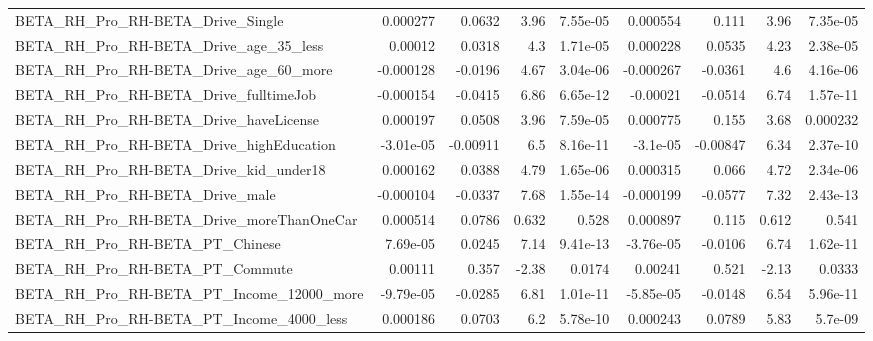 \begin{tabular}{lrrrrrrrr}
BETA\_RH\_Pro\_RH-BETA\_Drive\_Single                   &    0.000277 &       0.0632 &      3.96 & 7.55e-05 &   0.000554 &       0.111 &         3.96 &      7.35e-05 \\
BETA\_RH\_Pro\_RH-BETA\_Drive\_age\_35\_less              &     0.00012 &       0.0318 &       4.3 & 1.71e-05 &   0.000228 &      0.0535 &         4.23 &      2.38e-05 \\
BETA\_RH\_Pro\_RH-BETA\_Drive\_age\_60\_more              &   -0.000128 &      -0.0196 &      4.67 & 3.04e-06 &  -0.000267 &     -0.0361 &          4.6 &      4.16e-06 \\
BETA\_RH\_Pro\_RH-BETA\_Drive\_fulltimeJob              &   -0.000154 &      -0.0415 &      6.86 & 6.65e-12 &   -0.00021 &     -0.0514 &         6.74 &      1.57e-11 \\
BETA\_RH\_Pro\_RH-BETA\_Drive\_haveLicense              &    0.000197 &       0.0508 &      3.96 & 7.59e-05 &   0.000775 &       0.155 &         3.68 &      0.000232 \\
BETA\_RH\_Pro\_RH-BETA\_Drive\_highEducation            &   -3.01e-05 &     -0.00911 &       6.5 & 8.16e-11 &   -3.1e-05 &    -0.00847 &         6.34 &      2.37e-10 \\
BETA\_RH\_Pro\_RH-BETA\_Drive\_kid\_under18              &    0.000162 &       0.0388 &      4.79 & 1.65e-06 &   0.000315 &       0.066 &         4.72 &      2.34e-06 \\
BETA\_RH\_Pro\_RH-BETA\_Drive\_male                     &   -0.000104 &      -0.0337 &      7.68 & 1.55e-14 &  -0.000199 &     -0.0577 &         7.32 &      2.43e-13 \\
BETA\_RH\_Pro\_RH-BETA\_Drive\_moreThanOneCar           &    0.000514 &       0.0786 &     0.632 &    0.528 &   0.000897 &       0.115 &        0.612 &         0.541 \\
BETA\_RH\_Pro\_RH-BETA\_PT\_Chinese                     &    7.69e-05 &       0.0245 &      7.14 & 9.41e-13 &  -3.76e-05 &     -0.0106 &         6.74 &      1.62e-11 \\
BETA\_RH\_Pro\_RH-BETA\_PT\_Commute                     &     0.00111 &        0.357 &     -2.38 &   0.0174 &    0.00241 &       0.521 &        -2.13 &        0.0333 \\
BETA\_RH\_Pro\_RH-BETA\_PT\_Income\_12000\_more           &   -9.79e-05 &      -0.0285 &      6.81 & 1.01e-11 &  -5.85e-05 &     -0.0148 &         6.54 &      5.96e-11 \\
BETA\_RH\_Pro\_RH-BETA\_PT\_Income\_4000\_less            &    0.000186 &       0.0703 &       6.2 & 5.78e-10 &   0.000243 &      0.0789 &         5.83 &       5.7e-09 \\

\end{tabular}
